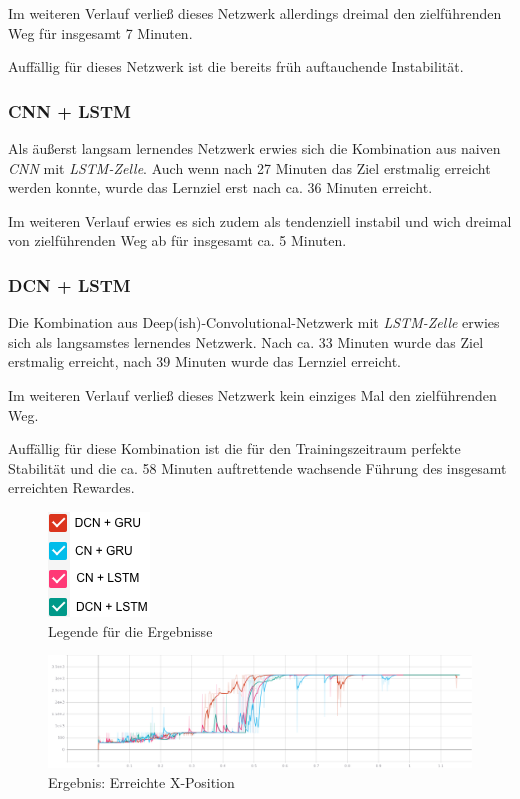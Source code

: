 \documentclass[sigconf,nonacm]{acmart}
\begin{document}
Im weiteren Verlauf verließ dieses Netzwerk allerdings dreimal den zielführenden Weg für insgesamt 7 Minuten.

Auffällig für dieses Netzwerk ist die bereits früh auftauchende Instabilität.

\subsubsection{CNN + LSTM}\hfill \break
Als äußerst langsam lernendes Netzwerk erwies sich die Kombination aus naiven \textit{CNN} mit \textit{LSTM-Zelle}. Auch wenn nach 27 Minuten das Ziel erstmalig erreicht werden konnte, wurde das Lernziel erst nach ca. 36 Minuten erreicht.

Im weiteren Verlauf erwies es sich zudem als tendenziell instabil und wich dreimal von zielführenden Weg ab für insgesamt ca. 5 Minuten.

\subsubsection{DCN + LSTM}\hfill \break
Die Kombination aus Deep(ish)-Convolutional-Netzwerk mit \textit{LSTM-Zelle} erwies sich als langsamstes lernendes Netzwerk. Nach ca. 33 Minuten wurde das Ziel erstmalig erreicht, nach 39 Minuten wurde das Lernziel erreicht.

Im weiteren Verlauf verließ dieses Netzwerk kein einziges Mal den zielführenden Weg.

Auffällig für diese Kombination ist die für den Trainingszeitraum perfekte Stabilität und die ca. 58 Minuten auftrettende wachsende Führung des insgesamt erreichten Rewardes.

\begin{figure}[hbt!]
\includegraphics[scale=0.5]{images/legende.png}
\caption{Legende für die Ergebnisse}
\label{fig:legende}
\end{figure}

\begin{figure}[hbt!]
\includegraphics[angle=90,scale=0.385]{images/x_position.png}
\caption{Ergebnis: Erreichte X-Position}
\label{fig:x}
\end{figure}
\end{document}
